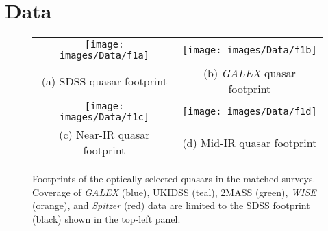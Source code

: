 \chapter{Data} \label{data}

\begin{figure}[t]
 \centering
 \begin{tabular}{cc}
 \texttt{[image: images/Data/f1a]} & \texttt{[image: images/Data/f1b]} \\
 (a) SDSS quasar footprint & (b) {\em GALEX} quasar footprint \\
 \texttt{[image: images/Data/f1c]} & \texttt{[image: images/Data/f1d]} \\
 (c) Near-IR quasar footprint & (d) Mid-IR quasar footprint
 \end{tabular}
 \caption[Matched survey footprints]{Footprints of the optically selected quasars in the matched surveys.  Coverage of {\em GALEX} (blue), UKIDSS (teal), 2MASS (green), {\em WISE} (orange), and {\em Spitzer} (red) data are limited to the SDSS footprint (black) shown in the top-left panel.}
\label{foot}
\end{figure}

